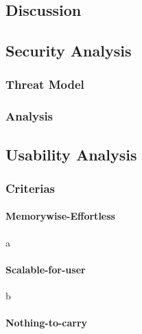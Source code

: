 \begin{CJK}{Bg5}{bsmi}


\chapter{Discussion}

\section{Security Analysis}

\begin{comment}
This is the most important part of an authentication system.
We have to define our threat model before we start to analyze.
There are 4 components in the scheme I proposed.
\end{comment}

\subsection{Threat Model}

\subsection{Analysis}

\section{Usability Analysis}

\subsection{Criterias}

\subsubsection{Memorywise-Effortless}

a

\subsubsection{Scalable-for-user}

b

\subsubsection{Nothing-to-carry}


\end{CJK}
